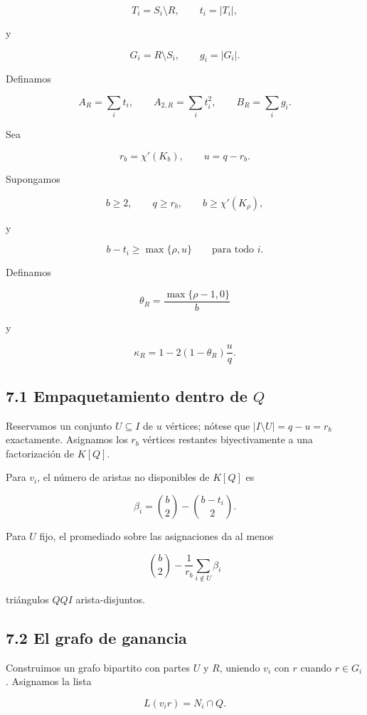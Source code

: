 \documentclass[
  spanish,
  11pt,
  a4paper,
]{article}
\begin{document}
\[
T_i=S_i\setminus R,
\qquad
t_i=|T_i|,
\]

y

\[
G_i=R\setminus S_i,
\qquad
g_i=|G_i|.
\]

Definamos

\[
A_R=\sum_i t_i,
\qquad
A_{2,R}=\sum_i t_i^2,
\qquad
B_R=\sum_i g_i.
\]

Sea

\[
r_b=\chi'(K_b),
\qquad
u=q-r_b.
\]

Supongamos

\[
b\ge2,
\qquad
q\ge r_b,
\qquad
b\ge\chi'(K_\rho),
\tag{7.1}
\]

y

\[
b-t_i\ge\max\{\rho,u\}
\qquad
\text{para todo }i.
\tag{7.2}
\]

Definamos

\[
\theta_R=\frac{\max\{\rho-1,0\}}{b}
\]

y

\[
\kappa_R
=
1-2(1-\theta_R)\frac{u}{q}.
\tag{7.3}
\]

\subsection{\texorpdfstring{7.1 Empaquetamiento dentro de \(Q\)}{7.1 Empaquetamiento dentro de Q}}\label{empaquetamiento-dentro-de-q}

Reservamos un conjunto \(U\subseteq I\) de \(u\) vértices; nótese que \(|I\setminus U|=q-u=r_b\) exactamente. Asignamos los \(r_b\) vértices restantes biyectivamente a una factorización de \(K[Q]\).

Para \(v_i\), el número de aristas no disponibles de \(K[Q]\) es

\[
\beta_i
=
\binom b2-\binom{b-t_i}{2}.
\tag{7.4}
\]

Para \(U\) fijo, el promediado sobre las asignaciones da al menos

\[
\binom b2-\frac1{r_b}\sum_{i\notin U}\beta_i
\tag{7.5}
\]

triángulos \(QQI\) arista-disjuntos.

\subsection{7.2 El grafo de ganancia}\label{el-grafo-de-ganancia}

Construimos un grafo bipartito con partes \(U\) y \(R\), uniendo \(v_i\) con \(r\) cuando \(r\in G_i\). Asignamos la lista

\[
L(v_ir)=N_i\cap Q.
\]
\end{document}

